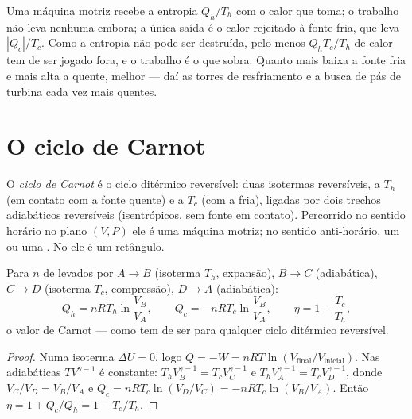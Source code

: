 \begin{remark}\label{rem:b1:heat-engines:why}
Uma máquina motriz recebe a entropia $Q_h/T_h$ com o calor que toma; o
trabalho não leva nenhuma embora; a única saída é o calor rejeitado à fonte
fria, que leva $|Q_c|/T_c$. Como a entropia não pode ser destruída, pelo
menos $Q_h T_c/T_h$ de calor tem de ser jogado fora, e o trabalho é o que
sobra. Quanto mais baixa a fonte fria e mais alta a quente, melhor --- daí
as torres de resfriamento e a busca de pás de turbina cada vez mais quentes.
\end{remark}

\section{O ciclo de Carnot}

\begin{definition}\label{def:b1:heat-engines:carnotcycle}
O \emph{ciclo de Carnot} é o ciclo ditérmico reversível: duas isotermas
reversíveis, a $T_h$ (em contato com a fonte quente) e a $T_c$ (com a
fria), ligadas por dois trechos adiabáticos reversíveis (isentrópicos,
sem fonte em contato). Percorrido no sentido horário no plano $(V, P)$ ele é
uma máquina motriz; no sentido anti-horário, um  ou uma . No  ele é um retângulo.
\end{definition}

\begin{proposition}\label{prop:b1:heat-engines:carnotgas}
Para $n$  de  levados por $A \to B$ (isoterma $T_h$,
expansão), $B \to C$ (adiabática), $C \to D$ (isoterma $T_c$,
compressão), $D \to A$ (adiabática):
\[
Q_h = nRT_h\ln\frac{V_B}{V_A}, \qquad
Q_c = -nRT_c\ln\frac{V_B}{V_A}, \qquad
\eta = 1 - \frac{T_c}{T_h} ,
\]
o valor de Carnot --- como tem de ser para qualquer ciclo ditérmico reversível.
\end{proposition}

\begin{proof}
Numa isoterma $\Delta U = 0$, logo $Q = -W = nRT\ln(V_{\text{final}}/
V_{\text{inicial}})$. Nas adiabáticas $TV^{\gamma-1}$ é constante:
$T_hV_B^{\gamma-1} = T_cV_C^{\gamma-1}$ e $T_hV_A^{\gamma-1} =
T_cV_D^{\gamma-1}$, donde $V_C/V_D = V_B/V_A$ e $Q_c = nRT_c\ln(V_D/V_C) =
-nRT_c\ln(V_B/V_A)$. Então $\eta = 1 + Q_c/Q_h = 1 - T_c/T_h$.
\end{proof}

